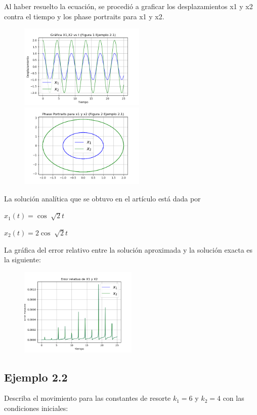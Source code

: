 \documentclass[a4paper]{article}
\begin{document}
Al haber resuelto la ecuación, se procedió a graficar los desplazamientos x1 y x2 contra el tiempo y los phase portraits para x1 y x2.

\begin{figure}[h!]
\centering 
\includegraphics[width=60mm]{Figura1Ex2_1.png}
\includegraphics[width=60mm]{Figura2Ex2_1.png}
\end{figure}

La solución analítica que se obtuvo en el artículo está dada por


\begin{center}
$x_1(t)=\cos\sqrt[]{2}t$

$x_2(t)=2\cos\sqrt[]{2}t$
\end{center}

La gráfica del error relativo entre la solución aproximada y la solución exacta es la siguiente:

\begin{figure}[ht!]
\centering
\includegraphics[width=0.5\textwidth]{ErrorEx2_1.png}
\end{figure}

\subsection{Ejemplo 2.2}
Describa el movimiento para las constantes de resorte $k_1=6$ y $k_2=4$ con las condiciones iniciales:
\end{document}
